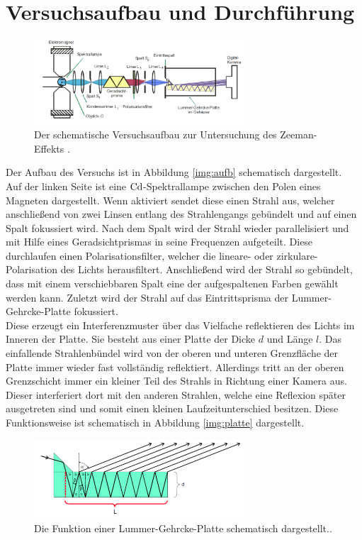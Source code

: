 \section{Versuchsaufbau und Durchführung}

\begin{figure}[H]
    \centering
    \includegraphics[width=0.7\textwidth]{latex/images/Aufbau.PNG}
    \caption{Der schematische Versuchsaufbau zur Untersuchung des Zeeman-Effekts \protect \cite{V27}.}
    \label{img:aufb}
\end{figure}
Der Aufbau des Versuchs ist in Abbildung \autoref{img:aufb} schematisch dargestellt.\\
Auf der linken Seite ist eine $\ce{Cd}$-Spektrallampe zwischen den Polen eines Magneten dargestellt. 
Wenn aktiviert sendet diese einen Strahl aus, welcher anschließend von zwei Linsen entlang des Strahlengangs gebündelt und auf einen Spalt fokussiert wird.
Nach dem Spalt wird der Strahl wieder parallelisiert und mit Hilfe eines Geradsichtprismas in seine Frequenzen aufgeteilt.
Diese durchlaufen einen Polarisationsfilter, welcher die lineare- oder zirkulare-Polarisation des Lichts herausfiltert.
Anschließend wird der Strahl so gebündelt, dass mit einem verschiebbaren Spalt eine der aufgespaltenen Farben gewählt werden kann. 
Zuletzt wird der Strahl auf das Eintrittsprisma der Lummer-Gehrcke-Platte fokussiert.\\
Diese erzeugt ein Interferenzmuster über das Vielfache reflektieren des Lichts im Inneren der Platte.
Sie besteht aus einer Platte der Dicke $d$ und Länge $l$. 
Das einfallende Strahlenbündel wird von der oberen und unteren Grenzfläche der Platte immer wieder fast vollständig reflektiert.
Allerdings tritt an der oberen Grenzschicht immer ein kleiner Teil des Strahls in Richtung einer Kamera aus. 
Dieser interferiert dort mit den anderen Strahlen, welche eine Reflexion später ausgetreten sind und somit einen kleinen Laufzeitunterschied besitzen.
Diese Funktionsweise ist schematisch in Abbildung \autoref{img:platte} dargestellt.
\begin{figure}[h]
    \centering
    \includegraphics[width=0.7\textwidth]{latex/images/Platte.PNG}
    \caption{Die Funktion einer Lummer-Gehrcke-Platte schematisch dargestellt.\protect \cite{V27}.}
    \label{img:platte}
\end{figure}

